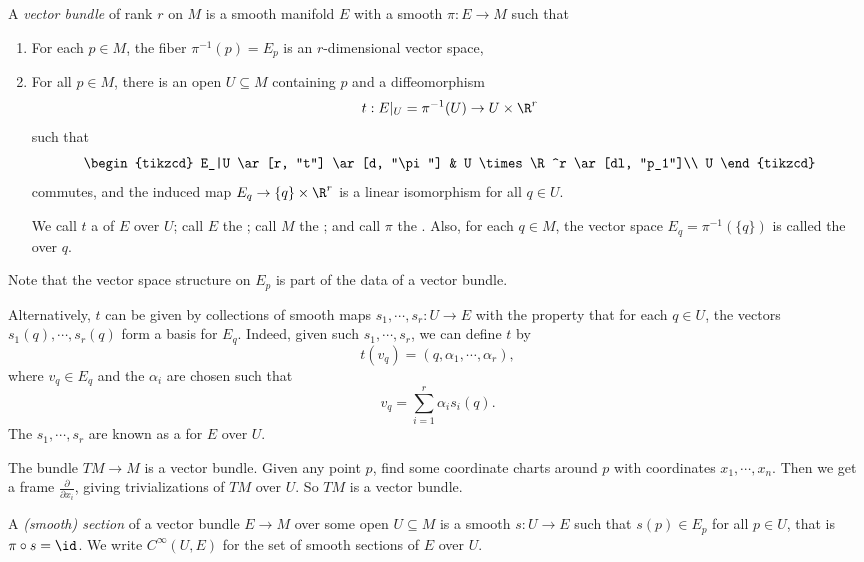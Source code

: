 \documentclass[a4paper]{article}
\begin{document}
\begin{defi}
  A \emph{vector bundle} of rank $r$ on $M$ is a smooth manifold $E$ with a smooth $\pi: E \to M$ such that
  \begin{enumerate}
    \item For each $p \in M$, the fiber $\pi^{-1}(p) = E_p$ is an $r$-dimensional vector space,
    \item For all $p \in M$, there is an open $U \subseteq M$ containing $p$ and a diffeomorphism
      \[
        t: E|_U = \pi^{-1}(U) \to U \times \R^r
      \]
      such that
      \[
        \begin{tikzcd}
          E_|U \ar[r, "t"] \ar[d, "\pi"] & U \times \R^r \ar[dl, "p_1"]\\
          U
        \end{tikzcd}
      \]
      commutes, and the induced map $E_q \to \{q\} \times \R^r$ is a linear isomorphism for all $q \in U$.

      We call $t$ a  of $E$ over $U$; call $E$ the ; call $M$ the ; and call $\pi$ the . Also, for each $q \in M$, the vector space $E_q = \pi^{-1}(\{q\})$ is called the  over $q$.
  \end{enumerate}
  Note that the vector space structure on $E_p$ is part of the data of a vector bundle.
\end{defi}

Alternatively, $t$ can be given by collections of smooth maps $s_1, \cdots, s_r: U \to E$ with the property that for each $q \in U$, the vectors $s_1(q), \cdots, s_r(q)$ form a basis for $E_q$. Indeed, given such $s_1, \cdots, s_r$, we can define $t$ by
\[
  t(v_q) = (q, \alpha_1, \cdots, \alpha_r),
\]
where $v_q \in E_q$ and the $\alpha_i$ are chosen such that
\[
  v_q = \sum_{i = 1}^r \alpha_i s_i(q).
\]
The $s_1, \cdots, s_r$ are known as a  for $E$ over $U$.

\begin{eg}
  The bundle $TM \to M$ is a vector bundle. Given any point $p$, find some coordinate charts around $p$ with coordinates $x_1, \cdots, x_n$. Then we get a frame $\frac{\partial}{\partial x_i}$, giving trivializations of $TM$ over $U$. So $TM$ is a vector bundle.
\end{eg}

\begin{defi}[Section]
  A \emph{(smooth) section} of a vector bundle $E \to M$ over some open $U \subseteq M$ is a smooth $s: U \to E$ such that $s(p) \in E_p$ for all $p \in U$, that is $\pi \circ s = \id$. We write $C^\infty(U, E)$ for the set of smooth sections of $E$ over $U$.
\end{defi}
\end{document}
